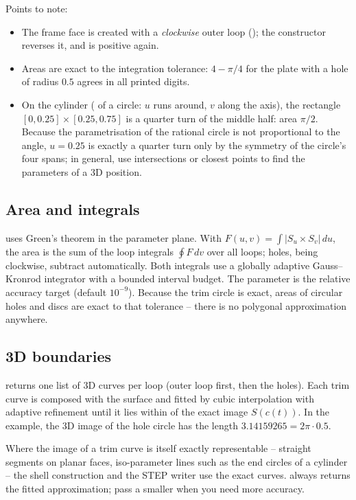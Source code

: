 Points to note:

\begin{itemize}
\item The frame face is created with a \emph{clockwise} outer loop
(); the constructor reverses it, and 
is positive again.
\item Areas are exact to the integration tolerance: $4-\pi/4$ for the plate with a hole of
radius $0.5$ agrees in all printed digits.
\item On the cylinder ( of a circle: $u$ runs around, $v$ along the axis), the
rectangle $[0, 0.25]\times[0.25, 0.75]$ is a quarter turn of the middle half: area $\pi/2$.
Because the parametrisation of the rational circle is not proportional to the angle, $u=0.25$
is exactly a quarter turn only by the symmetry of the circle's four spans; in general, use
intersections or closest points to find the parameters of a 3D position.
\end{itemize}

\subsection{Area and integrals}\label{sec:trim-area}

 uses Green's theorem in the parameter plane. With
$F(u,v) = \int |S_u\times S_v|\,du$, the area is the sum of the loop integrals
$\oint F\,dv$ over all loops; holes, being clockwise, subtract automatically. Both integrals
use a globally adaptive Gauss--Kronrod integrator with a bounded interval budget. The
parameter  is the relative accuracy target (default $10^{-9}$). Because the
trim circle is exact, areas of circular holes and discs are exact to that tolerance -- there is
no polygonal approximation anywhere.

\subsection{3D boundaries}\label{sec:trim-boundary}

 returns one list of 3D curves per loop (outer loop
first, then the holes). Each trim curve is composed with the surface and fitted by cubic
interpolation with adaptive refinement until it lies within  of the exact
image $S(c(t))$. In the example, the 3D image of the hole circle has the length
$3.14159265 = 2\pi\cdot0.5$.

\begin{tip}
Where the image of a trim curve is itself exactly representable -- straight segments on planar
faces, iso-parameter lines such as the end circles of a cylinder -- the shell construction and
the STEP writer use the exact curves.  always returns the fitted
approximation; pass a smaller  when you need more accuracy.
\end{tip}

